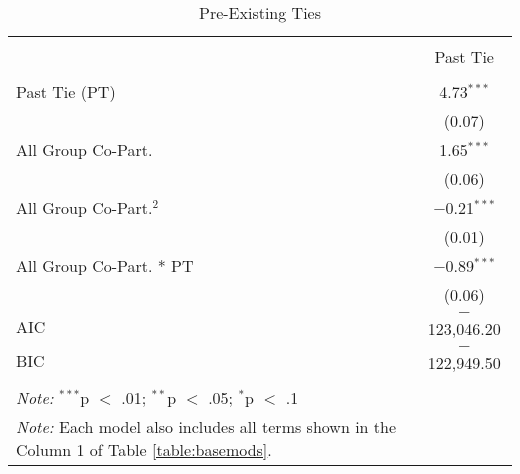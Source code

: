 
\begin{table}[!htbp] \centering 
  \caption{Pre-Existing Ties} 
  \label{table:pastties} 
\begin{tabular}{@{\extracolsep{5pt}}lc} 
\\[-1.8ex]\hline \\[-1.8ex] 
 & Past Tie \\ 
\hline \\[-1.8ex] 
 Past Tie (PT) & 4.73$^{***}$ \\ 
  & (0.07) \\ 
  All Group Co-Part. & 1.65$^{***}$ \\ 
  & (0.06) \\ 
  All Group Co-Part.$^2$ & $-$0.21$^{***}$ \\ 
  & (0.01) \\ 
  All Group Co-Part. * PT & $-$0.89$^{***}$ \\ 
  & (0.06) \\ 
 AIC & $-$123,046.20 \\ 
BIC & $-$122,949.50 \\ 
\hline \\[-1.8ex] 
\multicolumn{1}{l}{\textit{Note:} $^{***}$p $<$ .01; $^{**}$p $<$ .05; $^{*}$p $<$ .1} \\ 
\multicolumn{1}{l}{\textit{Note:} Each model also includes all terms shown in the Column 1 of Table \ref{table:basemods}.} \\
\end{tabular} 
\end{table} 
